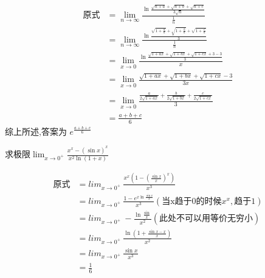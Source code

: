 \documentclass[12pt, a4paper, oneside, UTF8]{ctexbook}  %
\begin{document}
\begin{itemize}
\begin{problem}
          \end{problem}
          \begin{solution}
              \begin{align*}
                  \text{原式} & =   \lim_{n\rightarrow\infty}\frac{\ln\frac{\sqrt{n+a}+\sqrt{n+b}+\sqrt{n+c}}{3\sqrt{n}}}{\frac{1}{n}}              \\
                            & = \lim_{n\to\infty}\frac{\ln\frac{\sqrt{1+\frac{a}{n}}+\sqrt{1+\frac{b}{n}}+\sqrt{1+\frac{c}{n}}}{3}}{\frac{1}{n}}  \\
                            & = \lim_{x\to0}\frac{\ln\frac{\sqrt{1+ax}+\sqrt{1+bx}+\sqrt{1+cx}+3-3}{3}}{x}                                        \\
                            & = \lim_{x\rightarrow0}\frac{\sqrt{1+ax}+\sqrt{1+bx}+\sqrt{1+cx}-3}{3x}                                              \\
                            & = \operatorname*{lim}_{x\rightarrow0}\frac{\frac{a}{2\sqrt{1+ax}}+\frac{b}{2\sqrt{1+bx}}+\frac{c}{2\sqrt{1+cx}}}{3} \\
                            & = \frac{a+b+c}{6}
              \end{align*}
              综上所述,答案为  $e^{\frac{a+b+c}{6}}$
          \end{solution}
          \begin{problem}
          求极限$\operatorname*{lim}_{x\to0^+}\frac{x^{x}-(\sin x)^{x}}{x^{2}\ln(1+x)}$
          \end{problem}
          \begin{solution}
              \begin{align*}
                  \text{原式} & = {lim}_{x\to0^+}\ \frac{x^x (1-(\frac{\sin x}{x})^x)}{x^3}                               \\
                            & = {lim}_{x\to0^+}\ \frac{1-e^{x\ln \frac{\sin x}{x}}}{x^3}(\text{当x趋于0的时候}x^x,\text{趋于1}) \\
                            & = {lim}_{x\to0^+}\ - \frac{\ln \frac{\sin}{x}}{x^2} (\text{此处不可以用等价无穷小})                  \\
                            & = {lim}_{x\to0^+}\ \frac{\ln (1+\frac{\sin x - x}{x})}{x^2}                               \\
                            & = {lim}_{x\to0^+}\ \frac{\sin x}{x^3}                                                     \\
                            & = \frac{1}{6}

\end{align*}
\end{solution}
\end{itemize}
\end{document}
